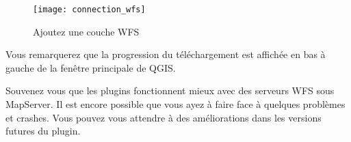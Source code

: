 \begin{figure}[ht]
  \begin{center}
 \caption{Ajoutez une couche WFS\nixcaption}\label{fig:wfs_dmsolutions}
 \texttt{[image: connection\_wfs]}
  \end{center}
\end{figure}
Vous remarquerez que la progression du t\'el\'echargement est affich\'ee en bas \`a
gauche de la fen\^etre principale de QGIS.

Souvenez vous que les plugins fonctionnent mieux avec des serveurs WFS sous
MapServer. Il est encore possible que vous ayez \`a faire face \`a quelques
probl\`emes et crashes. Vous pouvez vous attendre \`a des am\'eliorations dans les
versions futures du plugin.

\begin{Tip}[ht]\caption{\textsc{Trouver des serveurs WMS et WFS}}
\end{Tip}